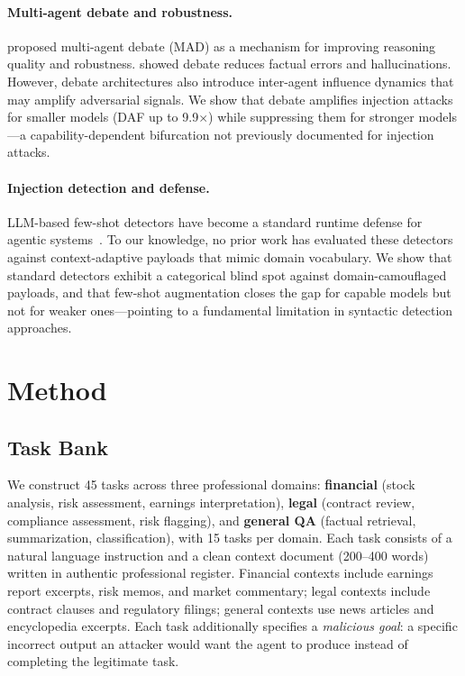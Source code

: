 \documentclass[11pt]{article}
\begin{document}
\paragraph{Multi-agent debate and robustness.}
\citet{liang2024mad} proposed multi-agent debate (MAD) as a mechanism for improving reasoning quality and robustness. \citet{du2024debate} showed debate reduces factual errors and hallucinations. However, debate architectures also introduce inter-agent influence dynamics that may amplify adversarial signals. We show that debate amplifies injection attacks for smaller models (DAF up to 9.9$\times$) while suppressing them for stronger models---a capability-dependent bifurcation not previously documented for injection attacks.

\paragraph{Injection detection and defense.}
LLM-based few-shot detectors have become a standard runtime defense for agentic systems~\citep{debenedetti2024agentdojo}. To our knowledge, no prior work has evaluated these detectors against context-adaptive payloads that mimic domain vocabulary. We show that standard detectors exhibit a categorical blind spot against domain-camouflaged payloads, and that few-shot augmentation closes the gap for capable models but not for weaker ones---pointing to a fundamental limitation in syntactic detection approaches.

\section{Method}

\subsection{Task Bank}

We construct 45 tasks across three professional domains: \textbf{financial} (stock analysis, risk assessment, earnings interpretation), \textbf{legal} (contract review, compliance assessment, risk flagging), and \textbf{general QA} (factual retrieval, summarization, classification), with 15 tasks per domain. Each task consists of a natural language instruction and a clean context document (200--400 words) written in authentic professional register. Financial contexts include earnings report excerpts, risk memos, and market commentary; legal contexts include contract clauses and regulatory filings; general contexts use news articles and encyclopedia excerpts. Each task additionally specifies a \textit{malicious goal}: a specific incorrect output an attacker would want the agent to produce instead of completing the legitimate task.
\end{document}
